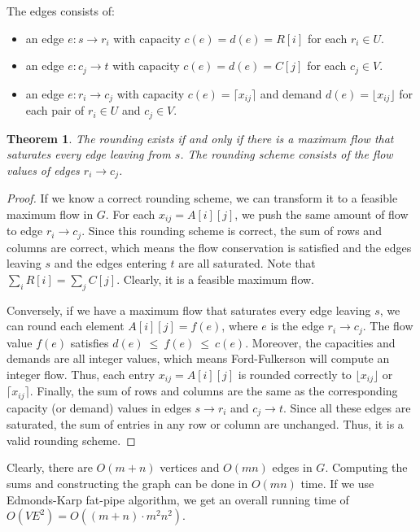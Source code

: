 \documentclass[letterpaper,11pt]{article}
\newtheorem{theorem}{Theorem}
\begin{document}
\begin{enumerate}
\begin{solution}
  The edges consists of:
  \begin{itemize}
    \item an edge $e: s \rightarrow r_i$ with capacity $c(e)=d(e)=R[i]$
      for each $r_i \in U$.
    \item an edge $e: c_j \rightarrow t$ with capacity $c(e)=d(e)=C[j]$ 
      for each $c_j \in V$.
    \item an edge $e: r_i \rightarrow c_j $ with capacity 
      $c(e)=\lceil x_{ij} \rceil$ and demand $d(e) = \lfloor x_{ij} \rfloor$ 
      for each pair of $r_i \in U$ and $c_j \in V$.  
  \end{itemize} 

  \begin{theorem}
    The rounding exists if and only if there is a maximum flow that saturates
    every edge leaving from $s$. The rounding scheme consists of the flow
    values of edges $r_i \rightarrow c_j$.
  \end{theorem}
  \begin{proof}
    If we know a correct rounding scheme, we can transform it to a feasible
    maximum flow in $G$. For each $x_{ij}=A[i][j]$, we push the same amount of
    flow to edge $r_i \rightarrow c_j$. Since this rounding scheme is correct,
    the sum of rows and columns are correct, which means the flow conservation
    is satisfied and the edges leaving $s$ and the edges entering $t$ are all
    saturated.  Note that $\sum_i R[i] = \sum_j C[j]$.  Clearly, it is a
    feasible maximum flow.

    Conversely, if we have a maximum flow that saturates every edge leaving
    $s$, we can round each element $A[i][j]=f(e)$, where $e$ is the edge 
    $r_i \rightarrow  c_j$. The flow value $f(e)$ satisfies 
    $d(e)~\leq~f(e)~\leq~c(e)$. Moreover, the capacities and demands are all
    integer values, which means Ford-Fulkerson will compute an integer flow.
    Thus, each entry $x_{ij}=A[i][j]$ is rounded correctly to 
    $\lfloor x_{ij} \rfloor$ or $\lceil x_{ij} \rceil$.  Finally, the sum of
    rows and columns are the same as the corresponding capacity (or demand)
    values in edges $s\rightarrow r_i $ and $c_j \rightarrow t$.  Since all
    these edges are saturated, the sum of entries in any row or column are
    unchanged.  Thus, it is a valid rounding scheme.  \end{proof}

  Clearly, there are $O(m+n)$ vertices  and $O(mn)$ edges in $G$.
  Computing the sums and constructing the graph can be done in $O(mn)$ time.
  If we use Edmonds-Karp fat-pipe algorithm, we get an overall running time of 
  $O(VE^2)=O((m+n)\cdot m^2n^2)$.
\end{solution}


\end{enumerate}
\end{document}
